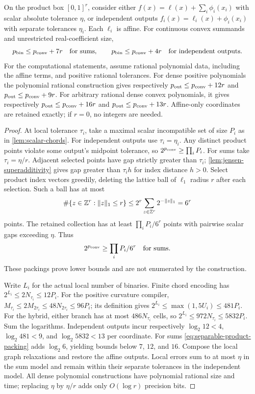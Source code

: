 \begin{theorem}\label{thm:separable-scalar}
On the product box $[0,1]^r$, consider either
$f(x)=\ell(x)+\sum_i\phi_i(x_i)$ with scalar absolute tolerance
$\eta$, or independent outputs $f_i(x)=\ell_i(x)+\phi_i(x_i)$
with separate tolerances $\eta_i$. Each $\ell_i$ is affine. For
continuous convex summands and unrestricted real-coefficient size,
\begin{equation}\label{eq:separable-finite-counts}
 p_{\mathrm{bin}}\le p_{\mathrm{conv}}+7r\quad\text{for sums},\qquad
 p_{\mathrm{bin}}\le p_{\mathrm{conv}}+4r\quad\text{for independent outputs}.
\end{equation}
For the computational statements, assume rational polynomial data,
including the affine terms, and positive rational tolerances.
For dense positive polynomials the polynomial rational
construction gives respectively $p_{\mathrm{out}}\le p_{\mathrm{conv}}+12r$ and
$p_{\mathrm{out}}\le p_{\mathrm{conv}}+9r$. For arbitrary rational dense convex polynomials,
it gives respectively $p_{\mathrm{out}}\le p_{\mathrm{conv}}+16r$ and
$p_{\mathrm{out}}\le p_{\mathrm{conv}}+13r$. Affine-only coordinates are retained exactly;
if $r=0$, no integers are needed.
\end{theorem}
\begin{proof}
At local tolerance $\tau_i$, take a maximal scalar incompatible set
of size $P_i$ as in \cref{lem:scalar-chords}. For independent outputs
use $\tau_i=\eta_i$. Any distinct product points violate some output's
midpoint tolerance, so $2^{p_{\mathrm{conv}}}\ge\prod_iP_i$.
For sums take $\tau_i=\eta/r$. Adjacent selected points have gap
strictly greater than $\tau_i$; \cref{lem:jensen-superadditivity}
gives gap greater than $\tau_i h$ for index distance $h>0$.
Select product index vectors greedily, deleting the lattice ball of
$\ell_1$ radius $r$ after each selection. Such a ball has at most
\[
 \#\{z\in\mathbb Z^r:\|z\|_1\le r\}
 \le2^r\sum_{z\in\mathbb Z^r}2^{-\|z\|_1}=6^r
\]
points. The retained collection has at least $\prod_iP_i/6^r$
points with pairwise scalar gaps exceeding $\eta$. Thus
\begin{equation}\label{eq:separable-product-packing}
 2^{p_{\mathrm{conv}}}\ge\prod_iP_i/6^r\quad\text{for sums}.
\end{equation}
These packings prove lower bounds and are not enumerated by the
construction.

Write $L_i$ for the actual local number of binaries. Finite chord
encoding has $2^{L_i}\le2N_{\tau_i}\le12P_i$. For the positive
curvature compiler,
$M_{\tau_i}\le2M_{2\tau_i}\le48N_{2\tau_i}\le96P_i$;
its definition gives $2^{L_i}\le\max(1,5U_i)\le481P_i$.
For the hybrid, either branch has at most $486N_{\tau_i}$ cells,
so $2^{L_i}\le972N_{\tau_i}\le5832P_i$.
Sum the logarithms. Independent outputs incur respectively
$\log_2 12<4$, $\log_2 481<9$, and $\log_2 5832<13$ per
coordinate. For sums \eqref{eq:separable-product-packing} adds
$\log_2 6$, yielding bounds below $7$, $12$, and $16$.
Compose the local graph relaxations and restore the affine outputs.
Local errors sum to at most $\eta$ in the sum model and remain within
their separate tolerances in the independent model. All dense
polynomial constructions have polynomial rational size and time;
replacing $\eta$ by $\eta/r$ adds only $O(\log r)$ precision bits.
\end{proof}

